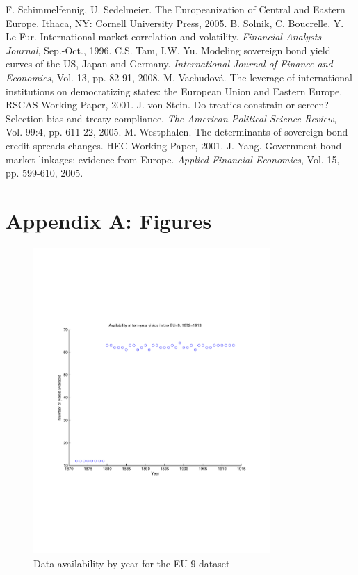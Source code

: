 \documentclass[3p]{elsarticle}
\begin{document}
\begin{thebibliography}
 F. Schimmelfennig, U. Sedelmeier. The Europeanization of Central and Eastern Europe. Ithaca, NY: Cornell University Press, 2005.
 B. Solnik, C. Boucrelle, Y. Le Fur. International market correlation and volatility. \textit{Financial Analysts Journal}, Sep.-Oct., 1996.
 C.S. Tam, I.W. Yu. Modeling sovereign bond yield curves of the US, Japan and Germany. \textit{International Journal of Finance and Economics}, Vol. 13, pp. 82-91, 2008.
 M. Vachudov\'a. The leverage of international institutions on democratizing states: the European Union and Eastern Europe. RSCAS Working Paper, 2001.
 J. von Stein. Do treaties constrain or screen? Selection bias and treaty compliance. \textit{The American Political Science Review}, Vol. 99:4, pp. 611-22, 2005.
 M. Westphalen. The determinants of sovereign bond credit spreads changes. HEC Working Paper, 2001.
 J. Yang. Government bond market linkages: evidence from Europe. \textit{Applied Financial Economics}, Vol. 15, pp. 599-610, 2005.
\end{thebibliography}

\newpage
\section*{Appendix A: Figures}
\begin{figure}[h]
	\centering
	\includegraphics[width=9cm]{fig_data_eu9}
	\caption{Data availability by year for the EU-9 dataset}
	\label{fig:data_eu9}
\end{figure}
\end{document}
